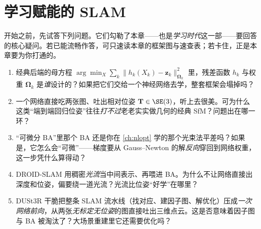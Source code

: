 \chapter{学习赋能的 SLAM}
\label{ch:learning}


\begin{practice}[前置自测]
开始之前，先试答下列问题。它们勾勒了本章——也是\emph{学习时代}这一部——要回答的核心疑问。若已能流畅作答，可只速读本章的框架图与速查表；若卡住，正是本章要为你打通的。
\begin{enumerate}
  \item 经典后端的母方程 $\arg\min_X\sum_k\|h_k(X_k)-\mathbf{z}_k\|^2_{\boldsymbol\Omega_k}$ 里，残差函数 $h_k$ 与权重 $\boldsymbol\Omega_k$ 是\emph{谁}设计的？如果把它们交给一个神经网络去学，整套框架会塌掉吗？
  \item 一个网络直接吃两张图、吐出相对位姿 $\mathbf{T}\in\SE(3)$，听上去很美。可为什么这类“端到端回归位姿”往往\emph{打不过}老老实实做几何的经典 SfM？问题出在哪一环？
  \item “可微分 BA”里那个 BA 还是你在 \cref{ch:nlopt} 学的那个光束法平差吗？如果是，它怎么会“可微”——梯度要从 Gauss--Newton 的解\emph{反向}穿回到网络权重，这一步凭什么算得动？
  \item DROID-SLAM 用稠密\emph{光流}当中间表示、再喂进 BA。为什么不让网络直接出深度和位姿，偏要绕一道光流？光流比位姿“好学”在哪里？
  \item DUSt3R 干脆把整条 SLAM 流水线（找对应、建因子图、解优化）压成\emph{一次网络前向}，从两张\emph{无标定无位姿}的图直接吐出三维点云。这是否意味着因子图与 BA 被淘汰了？大场景重建里它还需要优化吗？
\end{enumerate}
\end{practice}

